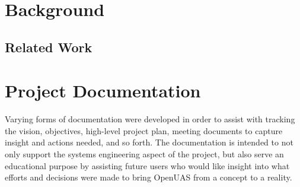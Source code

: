 ﻿\documentclass{article}
\begin{document}
\section{Background}

\subsection{Related Work}

\section{Project Documentation}

Varying forms of documentation were developed in order to assist with tracking the vision, objectives, high-level project plan, meeting documents to capture insight and actions needed, and so forth. The documentation is intended to not only support the systems engineering aspect of the project, but also serve an educational purpose by assisting future users who would like insight into what efforts and decisions were made to bring OpenUAS from a concept to a reality.
\end{document}
